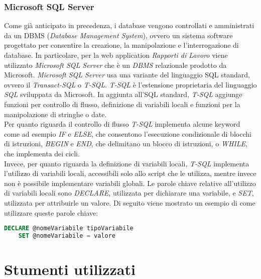   \subsubsection{Microsoft SQL Server}
  Come già anticipato in precedenza, i database vengono controllati e amministrati da un DBMS (\textit{Database Management
  System}), ovvero un sistema software progettato per consentire la creazione, la manipolazione e l'interrogazione di database.
  In particolare, per la web application \textit{Rapporti di Lavoro} viene utilizzato \textit{Microsoft SQL Server} che è
  un \textit{DBMS} relazionale prodotto da Microsoft. \textit{Microsoft SQL Server} usa una variante del linguaggio SQL
  standard, ovvero il \textit{Transact-SQL} o \textit{T-SQL}. \textit{T-SQL} è l'estensione proprietaria del linguaggio
  \textit{SQL} sviluppata da Microsoft. In aggiunta all'SQL standard, \textit{T-SQL} aggiunge funzioni per controllo di flusso,
  definizione di variabili locali e funzioni per la manipolazione di stringhe o date.\\
  Per quanto riguarda il controllo di flusso \textit{T-SQL} implementa alcune keyword come ad esempio \textit{IF} e
  \textit{ELSE}, che consentono l'esecuzione condizionale di blocchi di istruzioni, \textit{BEGIN} e \textit{END}, che
  delimitano un blocco di istruzioni, o \textit{WHILE}, che implementa dei cicli.\\
  Invece, per quanto riguarda la definizione di variabili locali, \textit{T-SQL} implementa l'utilizzo di variabili locali,
  accessibili solo allo script che le utilizza, mentre invece non è possibile implementare variabili globali.
  Le parole chiave relative all'utilizzo di variabili locali sono \textit{DECLARE},
  utilizzata per dichiarare una variabile, e \textit{SET}, utilizzata per attribuirle un valore. Di seguito viene mostrato un
  esempio di come utilizzare queste parole chiave:
  \begin{lstlisting}[language=sql]
    DECLARE @nomeVariabile tipoVariabile
    SET @nomeVariabile = valore
  \end{lstlisting}

  \section{Stumenti utilizzati}
